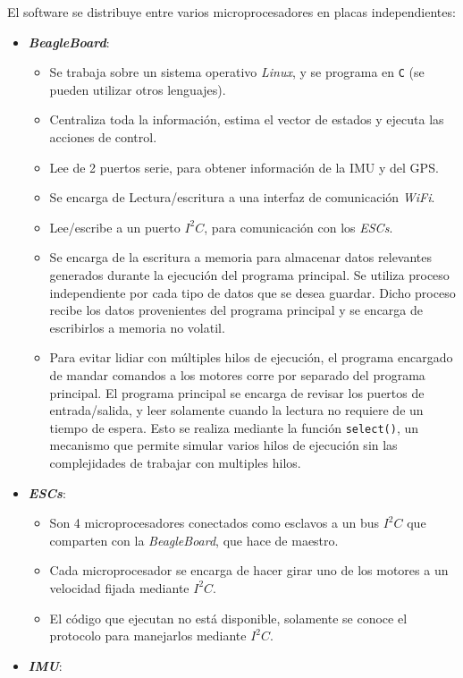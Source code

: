 \documentclass[main]{subfiles}
\begin{document}
El software se distribuye entre varios microprocesadores en placas independientes:
\begin{itemize}
\item \textbf{\textit{BeagleBoard}}:
  \begin{itemize}
  \item Se trabaja sobre un sistema operativo \textit{Linux}, y se programa en \verb+C+ (se pueden utilizar otros lenguajes).
  \item Centraliza toda la informaci\'on, estima el vector de estados y ejecuta las acciones de control.
  \item Lee de 2 puertos serie, para obtener informaci\'on de la IMU y del GPS.
  \item Se encarga de Lectura/escritura a una interfaz de comunicaci\'on \textit{WiFi}.
  \item Lee/escribe a un puerto $I^2C$, para comunicaci\'on con los \textit{ESCs}.
  \item Se encarga de la escritura a memoria para almacenar datos relevantes generados durante la ejecuci\'on del programa principal. Se utiliza proceso independiente por cada tipo de datos que se desea guardar. Dicho proceso recibe los datos provenientes del programa principal y se encarga de escribirlos a memoria no volatil.
  \item Para evitar lidiar con m\'ultiples hilos de ejecuci\'on, el programa encargado de mandar comandos a los motores corre por separado del programa principal. El programa principal se encarga de revisar los puertos de entrada/salida, y leer solamente cuando la lectura no requiere de un tiempo de espera. Esto se realiza mediante la funci\'on \verb+select()+, un mecanismo que permite simular varios hilos de ejecuci\'on sin las complejidades de trabajar con multiples hilos.
  \end{itemize}
\item \textbf{\textit{ESCs}}:
  \begin{itemize}
  \item Son 4 microprocesadores conectados como esclavos a un bus $I^2C$ que comparten con la \textit{BeagleBoard}, que hace de maestro.
  \item Cada microprocesador se encarga de hacer girar uno de los motores a un velocidad fijada mediante $I^2C$.
  \item El c\'odigo que ejecutan no est\'a disponible, solamente se conoce el protocolo para manejarlos mediante $I^2C$.
  \end{itemize}
\item \textbf{\textit{IMU}}:

\end{itemize}
\end{document}
